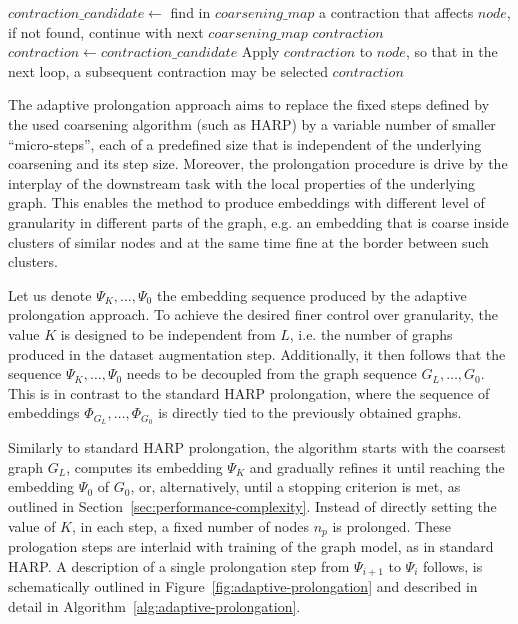 \begin{algorithm*}
\begin{algorithmic}
            \State $ contraction\_candidate \gets $ find in $ coarsening\_map $ a contraction that affects $ node $, if not found, continue with next $ coarsening\_map $
                \State \Return $ contraction $
            \EndIf
            \State $ contraction \gets contraction\_candidate $
            \State Apply $ contraction $ to $ node $, so that in the next loop, a subsequent contraction may be selected
        \EndFor
        \State \Return $ contraction $
    \EndFunction
  \end{algorithmic}
\end{algorithm*}

The adaptive prolongation approach aims to replace the fixed steps defined by the used coarsening algorithm (such as HARP) by a variable number of smaller \enquote{micro-steps}, each of a predefined size that is independent of the underlying coarsening and its step size. Moreover, the prolongation procedure is drive by the interplay of the downstream task with the local properties of the underlying graph. This enables the method to produce embeddings with different level of granularity in different parts of the graph, e.g. an embedding that is coarse inside clusters of similar nodes and at the same time fine at the border between such clusters.

Let us denote \( \Psi_K, \dots, \Psi_0 \) the embedding sequence produced by the adaptive prolongation approach. To achieve the desired finer control over granularity, the value \( K \) is designed to be independent from \( L \), i.e. the number of graphs produced in the dataset augmentation step. Additionally, it then follows that the sequence \( \Psi_K, \dots, \Psi_0 \) needs to be decoupled from the graph sequence \( G_L, \dots, G_0 \). This is in contrast to the standard HARP prolongation, where the sequence of embeddings \( \Phi_{G_L}, \dots, \Phi_{G_0} \) is directly tied to the previously obtained graphs.

Similarly to standard HARP prolongation, the algorithm starts with the coarsest graph \( G_L \), computes its embedding \( \Psi_K \) and gradually refines it until reaching the embedding \( \Psi_0 \) of \( G_0 \), or, alternatively, until a stopping criterion is met, as outlined in Section~\ref{sec:performance-complexity}. Instead of directly setting the value of \( K \), in each step, a fixed number of nodes \( n_p \) is prolonged. These prologation steps are interlaid with training of the graph model, as in standard HARP.  A description of a single prolongation step from \( \Psi_{i + 1} \) to \( \Psi_i \) follows, is schematically outlined in Figure~\ref{fig:adaptive-prolongation} and described in detail in Algorithm~\ref{alg:adaptive-prolongation}.

